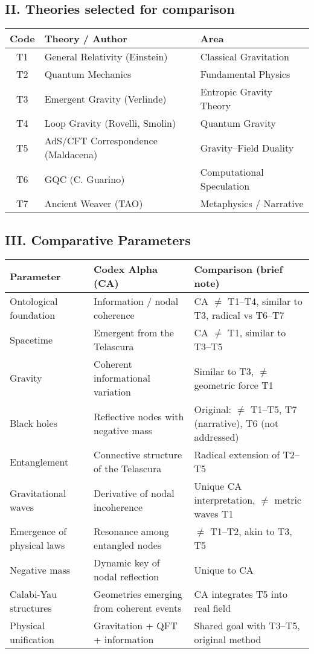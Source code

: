 \documentclass[12pt]{article}
\begin{document}
\subsection*{II. Theories selected for comparison}
\begin{center}
\begin{tabular}{|c|l|l|}
\hline
\textbf{Code} & \textbf{Theory / Author} & \textbf{Area} \\
\hline
T1 & General Relativity (Einstein) & Classical Gravitation \\
T2 & Quantum Mechanics & Fundamental Physics \\
T3 & Emergent Gravity (Verlinde) & Entropic Gravity Theory \\
T4 & Loop Gravity (Rovelli, Smolin) & Quantum Gravity \\
T5 & AdS/CFT Correspondence (Maldacena) & Gravity–Field Duality \\
T6 & GQC (C. Guarino) & Computational Speculation \\
T7 & Ancient Weaver (TAO) & Metaphysics / Narrative \\
\hline
\end{tabular}
\end{center}
\subsection*{III. Comparative Parameters}
\begin{center}
\begin{longtable}{|p{4cm}|p{5.2cm}|p{6.8cm}|}
\hline
\textbf{Parameter} & \textbf{Codex Alpha (CA)} & \textbf{Comparison (brief note)} \\
\hline
Ontological foundation & Information / nodal coherence & CA $\neq$ T1--T4, similar to T3, radical vs T6--T7 \\
Spacetime & Emergent from the Telascura & CA $\neq$ T1, similar to T3--T5 \\
Gravity & Coherent informational variation & Similar to T3, $\neq$ geometric force T1 \\
Black holes & Reflective nodes with negative mass & Original: $\neq$ T1--T5, T7 (narrative), T6 (not addressed) \\
Entanglement & Connective structure of the Telascura & Radical extension of T2--T5 \\
Gravitational waves & Derivative of nodal incoherence & Unique CA interpretation, $\neq$ metric waves T1 \\
Emergence of physical laws & Resonance among entangled nodes & $\neq$ T1--T2, akin to T3, T5 \\
Negative mass & Dynamic key of nodal reflection & Unique to CA \\
Calabi-Yau structures & Geometries emerging from coherent events & CA integrates T5 into real field \\
Physical unification & Gravitation + QFT + information & Shared goal with T3--T5, original method \\
\hline
\end{longtable}
\end{center}
\end{document}
